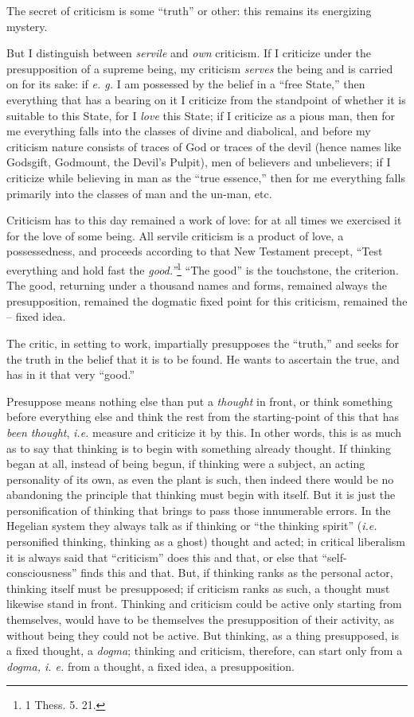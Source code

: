 \documentclass[12pt,a4paper]{book}
\begin{document}
The secret of criticism is some ``truth'' or other: this remains its 
energizing mystery.

But I distinguish between \textit{servile} and \textit{own} criticism. If I 
criticize under the presupposition of a supreme being, my criticism 
\textit{serves} the being and is carried on for its sake: if \textit{e. g.} I 
am possessed by the belief in a ``free State,'' then everything that has a 
bearing on it I criticize from the standpoint of whether it is suitable to 
this State, for I \textit{love} this State; if I criticize as a pious man, 
then for me everything falls into the classes of divine and diabolical, and 
before my criticism nature consists of traces of God or traces of the devil 
(hence names like Godsgift, Godmount, the Devil's Pulpit), men of believers 
and unbelievers; if I criticize while believing in man as the ``true 
essence,'' then for me everything falls primarily into the classes of man and 
the un-man, etc.

Criticism has to this day remained a work of love: for at all times we 
exercised it for the love of some being. All servile criticism is a product of 
love, a possessedness, and proceeds according to that New Testament precept, 
``Test everything and hold fast the \textit{good.''}\footnote{1 Thess. 5. 
21.} ``The good'' is the touchstone, the criterion. The good, returning 
under a thousand names and forms, remained always the presupposition, remained 
the dogmatic fixed point for this criticism, remained the -- fixed idea.

The critic, in setting to work, impartially presupposes the ``truth,'' and 
seeks for the truth in the belief that it is to be found. He wants to 
ascertain the true, and has in it that very ``good.''

Presuppose means nothing else than put a \textit{thought} in front, or think 
something before everything else and think the rest from the starting-point of 
this that has \textit{been thought}, \textit{i.e.} measure and criticize it by 
this. In other words, this is as much as to say that thinking is to begin with 
something already thought. If thinking began at all, instead of being begun, 
if thinking were a subject, an acting personality of its own, as even the 
plant is such, then indeed there would be no abandoning the principle that 
thinking must begin with itself. But it is just the personification of 
thinking that brings to pass those innumerable errors. In the Hegelian system 
they always talk as if thinking or ``the thinking spirit'' (\textit{i.e.} 
personified thinking, thinking as a ghost) thought and acted; in critical 
liberalism it is always said that ``criticism'' does this and that, or else 
that ``self- consciousness'' finds this and that. But, if thinking ranks as 
the personal actor, thinking itself must be presupposed; if criticism ranks as 
such, a thought must likewise stand in front. Thinking and criticism could be 
active only starting from themselves, would have to be themselves the 
presupposition of their activity, as without being they could not be active. 
But thinking, as a thing presupposed, is a fixed thought, a \textit{dogma}; 
thinking and criticism, therefore, can start only from a \textit{dogma, i. e.} 
from a thought, a fixed idea, a presupposition.
\end{document}
